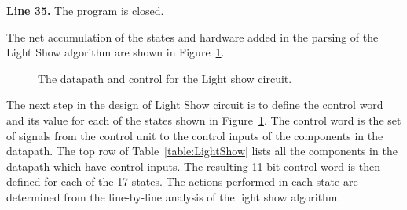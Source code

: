 \textbf{ Line 35.}  The program is closed.

The net accumulation of the states and hardware added in the parsing of the Light Show 
algorithm are shown in Figure~\ref{fig:datapathControlLightShowCir}.
 
\begin{figure}[ht]
\caption{The datapath and control for the Light show circuit.}
\label{fig:datapathControlLightShowCir}
\end{figure}

The next step in the design of Light Show circuit is to define the control word and 
its value for each of the states shown in Figure~\ref{fig:datapathControlLightShowCir}.  The control 
word is the set of signals from the control unit to the control inputs of the 
components in the datapath.  The top row of Table~\ref{table:LightShow} lists all 
the components in the datapath which have control inputs.  The resulting 11-bit control 
word is then defined for each of the 17 states. The actions performed in each state 
are determined from the line-by-line analysis of the light show algorithm.

